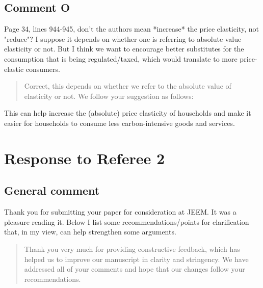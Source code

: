 \documentclass[11pt]{article}
\newenvironment{response}
{\begin{quote}\color{black}}
{\end{quote}}
\begin{document}
\subsection*{Comment O}\label{comment_R1_O}

\begin{commentbox}
    Page 34, lines 944-945, don't the authors mean *increase* the price elasticity, not "reduce"? I suppose it depends on whether one is referring to absolute value elasticity or not. But I think we want to encourage better substitutes for the consumption that is being regulated/taxed, which would translate to more price-elastic consumers.
\end{commentbox}

\begin{response}
    Correct, this depends on whether we refer to the absolute value of elasticity or not. We follow your suggestion as follows:
\end{response}

\begin{revisionbox}
    This can help increase the (absolute) price elasticity of households and make it easier for households to consume less carbon-intensive goods and services.
\end{revisionbox}

\clearpage

\section*{Response to Referee 2}

\subsection*{General comment}\label{comment_R2_0}

\begin{commentbox}
    Thank you for submitting your paper for consideration at JEEM. It was a pleasure reading it. Below I list some recommendations/points for clarification that, in my view, can help strengthen some arguments.
\end{commentbox}

\begin{response}
    Thank you very much for providing constructive feedback, which has helped us to improve our manuscript in clarity and stringency. We have addressed all of your comments and hope that our changes follow your recommendations.
\end{response}
    
\end{document}
